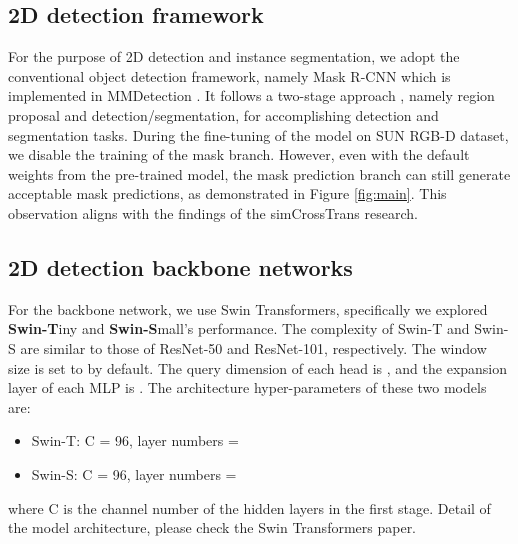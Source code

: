 \documentclass[]{modified_llncs}
\begin{document}
\subsection{2D detection framework}
For the purpose of 2D detection and instance segmentation, we adopt the conventional object detection framework, namely Mask R-CNN \cite{maskrcnn} which is implemented in MMDetection \cite{mmdetection}. It follows a two-stage approach \cite{DBLP:journals/corr/abs-1905-12683}, namely region proposal and detection/segmentation, for accomplishing detection and segmentation tasks. During the fine-tuning of the model on SUN RGB-D dataset, we disable the training of the mask branch. However, even with the default weights from the pre-trained model, the mask prediction branch can still generate acceptable mask predictions, as demonstrated in Figure \ref{fig:main}. This observation aligns with the findings of the simCrossTrans \cite{simCrossTrans_cite} research.\\
\subsection{2D detection backbone networks}
For the backbone network, we use Swin Transformers\cite{liu2021Swin}, specifically we explored \textbf{Swin-T}iny and \textbf{Swin-S}mall's performance. The complexity of Swin-T and Swin-S are similar to those of ResNet-50 and ResNet-101, respectively. The window size is set to  by default. The query dimension of each head is , and the expansion layer of each MLP is . The architecture hyper-parameters of these two models are:
\begin{itemize}
    \item Swin-T: C = 96, layer numbers = 
    \item Swin-S: C = 96, layer numbers = 
\end{itemize}
where C is the channel number of the hidden layers in the first stage. Detail of the model architecture, please check the Swin Transformers\cite{liu2021Swin} paper.\\
\end{document}
